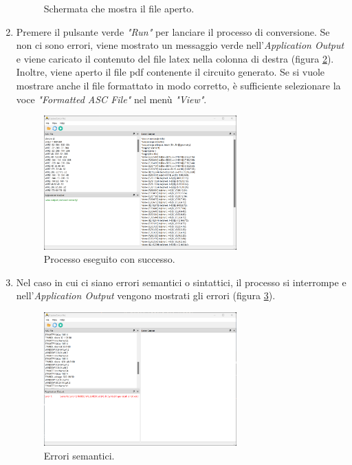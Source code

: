 \begin{enumerate}
\begin{figure}[h!]
		\caption{Schermata che mostra il file aperto.}
		\label{fig:punto_2}
	\end{figure}
	\newpage
	\item Premere il pulsante verde \textit{"Run"} per lanciare il processo di conversione. Se non ci sono errori, viene mostrato un messaggio verde nell'\textit{Application Output} e viene caricato il contenuto del file latex nella colonna di destra (figura \ref{fig:punto_3}). Inoltre, viene aperto il file pdf contenente il circuito generato. Se si vuole mostrare anche il file formattato in modo corretto, è sufficiente selezionare la voce \textit{"Formatted ASC File"} nel menù \textit{"View"}.
	\begin{figure}[h!]
		\centering
		\includegraphics[width=0.7\textwidth]{./ImageFiles/run con successo.png}
		\caption{Processo eseguito con successo.}
		\label{fig:punto_3}
	\end{figure}
	\item Nel caso in cui ci siano errori semantici o sintattici, il processo si interrompe e nell'\textit{Application Output} vengono mostrati gli errori (figura \ref{fig:punto_4}).
	\begin{figure}[h!]
		\centering
		\includegraphics[width=0.7\textwidth]{./ImageFiles/semantic error.png}
		\caption{Errori semantici.}
		\label{fig:punto_4}
	\end{figure}
\end{enumerate}




